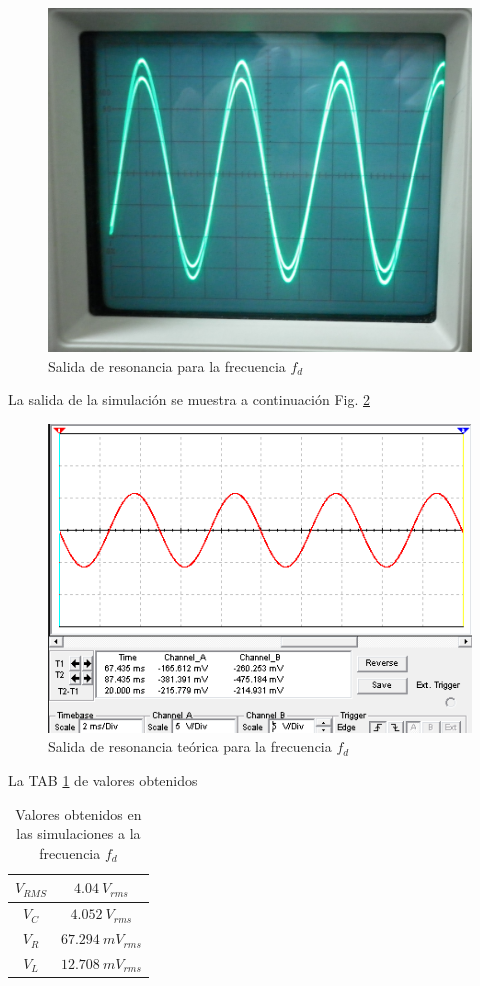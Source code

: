 \documentclass[twocolumn]{IEEEtran}
\begin{document}
\begin{figure}[H]
	\centering
		\includegraphics[scale=0.1]{368.png}
	\caption{Salida de resonancia para la frecuencia $f_d$}
	\label{fig4}
\end{figure}
La salida de la simulación se muestra a continuación Fig. \ref{teo4}
\begin{figure}[H]
	\centering
		\includegraphics[scale=0.5]{sim3.png}
	\caption{Salida de resonancia teórica para la frecuencia $f_d$}
	\label{teo4}
\end{figure}
\noindent
La TAB \ref{tabteo4} de valores obtenidos 
\begin{table}[H]
	\centering
\begin{tabular}[c]{|c|c|} \hline
$V_{RMS}$ & $4.04 \ V_{rms}$ \\ \hline
$V_{C}$ & $4.052 \ V_{rms}$ \\ \hline
$V_{R}$ & $67.294 \ mV_{rms}$ \\ \hline
$V_{L}$ & $12.708 \ mV_{rms}$ \\ \hline
\end{tabular}
	\caption{Valores obtenidos en las simulaciones a la frecuencia $f_d$}
	\label{tabteo4}
\end{table}
\end{document}
